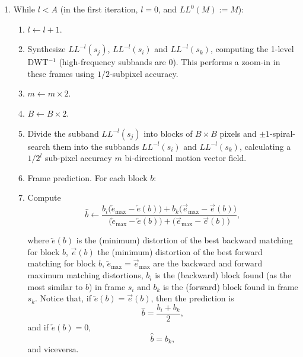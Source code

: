 \begin{enumerate}
\item
  While \(l<A\) (in the first iteration, \(l=0\), and \(LL^0(M):=M\)):
  
  \begin{enumerate}
  \item
    \(l\leftarrow l+1\).
    
  \item
    Synthesize \(LL^{-l}(s_j)\), \(LL^{-l}(s_i)\) and \(LL^{-l}(s_k)\),
    computing the 1-level DWT\(^{-1}\) (high-frequency subbands are
    \(0\)). This performs a zoom-in in these frames using \(1/2\)-subpixel
    accuracy. 
    
    
  \item
    \(m\leftarrow m\times 2\).
    
    
  \item
    \(B\leftarrow B\times 2\).
    
  \item
    Divide the subband \(LL^{-l}(s_j)\) into blocks of \(B\times B\)
    pixels and \(\pm 1\)-spiral-search them into the subbands
    \(LL^{-l}(s_i)\) and \(LL^{-l}(s_k)\), calculating a \(1/2^l\)
    sub-pixel accuracy \(m\) bi-directional motion vector field. 
    
  \item
    Frame prediction. For each block \(b\):
    
  \item
    Compute
    \begin{equation}
      \hat{b}\leftarrow \frac{b_i\big(\overleftarrow{e}_{\text{max}}-\overleftarrow{e}(b)\big) + b_k\big(\overrightarrow{e}_{\text{max}}-\overrightarrow{e}(b)\big)}{\big(\overleftarrow{e}_{\text{max}}-\overleftarrow{e}(b)\big) + \big(\overrightarrow{e}_{\text{max}}-\overrightarrow{e}(b)\big)},
    \end{equation}
    
    where \(\overleftarrow{e}(b)\) is the (minimum) distortion of the
    best backward matching for block \(b\), \(\overrightarrow{e}(b)\)
    the (minimum) distortion of the best forward matching for block
    \(b\),
    \(\overleftarrow{e}_{\text{max}}=\overrightarrow{e}_{\text{max}}\) are
    the backward and forward maximum matching distortions, \(b_i\) is
    the (backward) block found (as the most similar to \(b\)) in frame
    \(s_i\) and \(b_k\) is the (forward) block found in frame
    \(s_k\). Notice that, if
    \(\overleftarrow{e}(b)=\overrightarrow{e}(b)\), then the
    prediction is
    \begin{equation}
      \hat{b} = \frac{b_i + b_k}{2},
    \end{equation}
    and if \(\overleftarrow{e}(b)=0\),
    \begin{equation}
      \hat{b} = b_k,
    \end{equation} and viceversa.
  \end{enumerate}
\end{enumerate}

